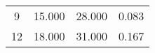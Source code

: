 % 
\begin{tabular}{cccc}
  \hline
  \hline
9 & 15.000 & 28.000 & 0.083 \\ 
  12 & 18.000 & 31.000 & 0.167 \\ 
   \hline
\end{tabular}
